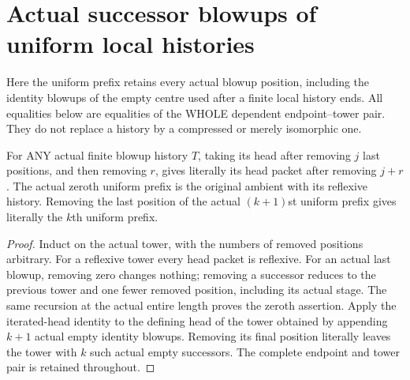 \section{Actual successor blowups of uniform local histories}

Here the uniform prefix retains every actual blowup position, including the
identity blowups of the empty centre used after a finite local history ends.
All equalities below are equalities of the WHOLE dependent endpoint--tower
pair. They do not replace a history by a compressed or merely isomorphic one.

\begin{lemma}
\label{hir:sharp-actual-curve-uniform-prefix-head-successor}
\leanok
For ANY actual finite blowup history $T$, taking its head after removing $j$
last positions, and then removing $r$, gives literally its head packet after
removing $j+r$. The actual zeroth uniform prefix is the original ambient
with its reflexive history. Removing the last position of the actual
$(k+1)$st uniform prefix gives literally the $k$th uniform prefix.
\end{lemma}
\begin{proof}
Induct on the actual tower, with the numbers of removed positions arbitrary.
For a reflexive tower every head packet is reflexive. For an actual last
blowup, removing zero changes nothing; removing a successor reduces to the
previous tower and one fewer removed position, including its actual stage.
The same recursion at the actual entire length proves the zeroth assertion.
Apply the iterated-head identity to the defining head of the tower obtained
by appending $k+1$ actual empty identity blowups. Removing its final position
literally leaves the tower with $k$ such actual empty successors. The complete
endpoint and tower pair is retained throughout.
\end{proof}

